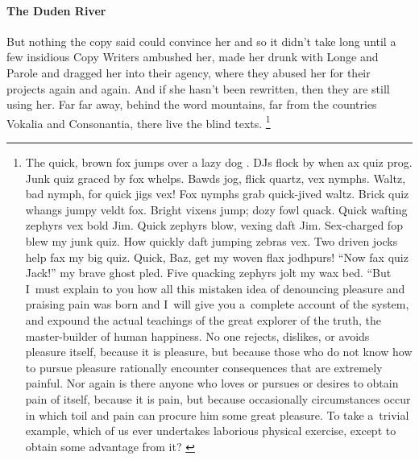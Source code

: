 \paragraph{The Duden River}
\label{sec:tests:lorem-ipsum:main:duden}
But nothing the copy said could convince her and so it didn't take long until a few insidious Copy Writers ambushed her, made her drunk with Longe and Parole and dragged her into their agency, where they abused her for their projects again and again. And if she hasn't been rewritten, then they are still using her. Far far away, behind the word mountains, far from the countries Vokalia and Consonantia, there live the blind texts.%
\footnote{The quick, brown fox jumps over a lazy dog \citep{knuth:ct:b, knuth:ct:c}. DJs flock by when  ax quiz prog. Junk  quiz graced by fox whelps. Bawds jog, flick quartz, vex nymphs. Waltz, bad nymph, for quick jigs vex! Fox nymphs grab quick-jived waltz. Brick quiz whangs jumpy veldt fox. Bright vixens jump; dozy fowl quack. Quick wafting zephyrs vex bold Jim. Quick zephyrs blow, vexing daft Jim. Sex-charged fop blew my junk  quiz. How quickly daft jumping zebras vex. Two driven jocks help fax my big quiz. Quick, Baz, get my woven flax jodhpurs! ``Now fax quiz Jack!'' my brave ghost pled. Five quacking zephyrs jolt my wax bed. ``But I~must explain to you how all this mistaken idea of denouncing pleasure and praising pain was born and I~will give you a~complete account of the system, and expound the actual teachings of the great explorer of the truth, the master-builder of human happiness. No one rejects, dislikes, or avoids pleasure itself, because it is pleasure, but because those who do not know how to pursue pleasure rationally encounter consequences that are extremely painful. Nor again is there anyone who loves or pursues or desires to obtain pain of itself, because it is pain, but because occasionally circumstances occur in which toil and pain can procure him some great pleasure. To take a~trivial example, which of us ever undertakes laborious physical exercise, except to obtain some advantage from it? %
\citep[210.]{cicero}}

